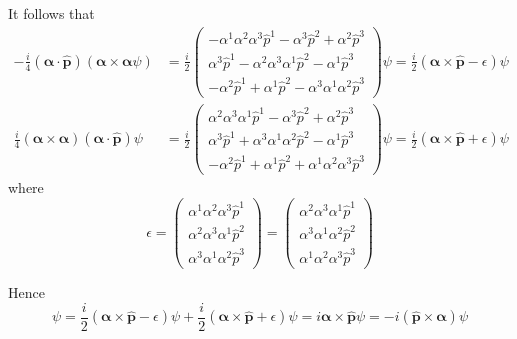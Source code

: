 It follows that
\begin{align*}
-\frac{i}{4}
(\boldsymbol\alpha\cdot\hat{\mathbf p})(\boldsymbol\alpha\times\boldsymbol\alpha\psi)
&=\frac{i}{2}\begin{pmatrix}
-\alpha^1\alpha^2\alpha^3\hat p^1-\alpha^3\hat p^2+\alpha^2\hat p^3
\\
\alpha^3\hat p^1-\alpha^2\alpha^3\alpha^1\hat p^2-\alpha^1\hat p^3
\\
-\alpha^2\hat p^1+\alpha^1\hat p^2-\alpha^3\alpha^1\alpha^2\hat p^3
\end{pmatrix}\psi
=\frac{i}{2}(\boldsymbol\alpha\times\hat{\mathbf p}-\epsilon)\psi
\\[1ex]
\frac{i}{4}
(\boldsymbol\alpha\times\boldsymbol\alpha)(\boldsymbol\alpha\cdot\hat{\mathbf p})\psi
&=\frac{i}{2}\begin{pmatrix}
\alpha^2\alpha^3\alpha^1\hat p^1-\alpha^3\hat p^2+\alpha^2\hat p^3
\\
\alpha^3\hat p^1+\alpha^3\alpha^1\alpha^2\hat p^2-\alpha^1\hat p^3
\\
-\alpha^2\hat p^1+\alpha^1\hat p^2+\alpha^1\alpha^2\alpha^3\hat p^3
\end{pmatrix}\psi
=\frac{i}{2}(\boldsymbol\alpha\times\hat{\mathbf p}+\epsilon)\psi
\end{align*}
where
\begin{equation*}
\epsilon=\begin{pmatrix}
\alpha^1\alpha^2\alpha^3\hat p^1
\\
\alpha^2\alpha^3\alpha^1\hat p^2
\\
\alpha^3\alpha^1\alpha^2\hat p^3
\end{pmatrix}
=\begin{pmatrix}
\alpha^2\alpha^3\alpha^1\hat p^1
\\
\alpha^3\alpha^1\alpha^2\hat p^2
\\
\alpha^1\alpha^2\alpha^3\hat p^3
\end{pmatrix}
\end{equation*}

Hence
\begin{equation*}
[\hat H_D,\hat{\mathbf S}]\psi
=\frac{i}{2}(\boldsymbol\alpha\times\hat{\mathbf p}-\epsilon)\psi
+\frac{i}{2}(\boldsymbol\alpha\times\hat{\mathbf p}+\epsilon)\psi
=i\boldsymbol\alpha\times\hat{\mathbf p}\psi
=-i(\hat{\mathbf p}\times\boldsymbol\alpha)\psi
\end{equation*}


